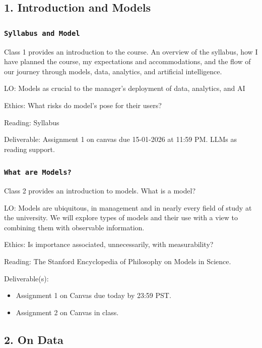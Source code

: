 \documentclass[11pt,]{article}
\begin{document}
\subsection{1. Introduction and Models}\label{introduction-and-models}

\subsubsection{\texorpdfstring{\texttt{Syllabus\ and\ Model}}{Syllabus and Model}}\label{syllabus-and-model}

Class 1 provides an introduction to the course. An overview of the
syllabus, how I have planned the course, my expectations and
accommodations, and the flow of our journey through models, data,
analytics, and artificial intelligence.

LO: Models as crucial to the manager's deployment of data, analytics,
and AI

Ethics: What risks do model's pose for their users?

Reading: Syllabus

Deliverable: Assignment 1 on canvas due 15-01-2026 at 11:59 PM. LLMs as
reading support.

\subsubsection{\texorpdfstring{\texttt{What\ are\ Models?}}{What are Models?}}\label{what-are-models}

Class 2 provides an introduction to models. What is a model?

LO: Models are ubiquitous, in management and in nearly every field of
study at the university. We will explore types of models and their use
with a view to combining them with observable information.

Ethics: Is importance associated, unnecessarily, with measurability?

Reading: The Stanford Encyclopedia of Philosophy on Models in Science.

Deliverable(s):

\begin{itemize}
\item Assignment 1 on Canvas due today by 23:59 PST.
\item Assignment 2 on Canvas in class.
\end{itemize}

\subsection{2. On Data}\label{on-data}
\end{document}
